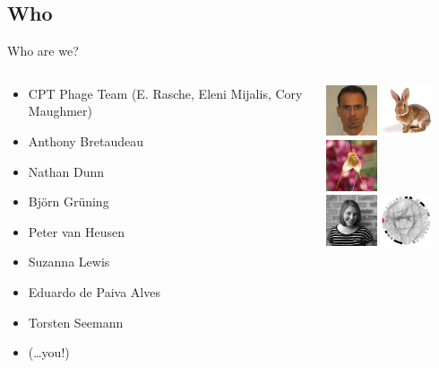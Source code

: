 \documentclass[12pt]{phage3slides} %
\begin{document}
\subsection{Who}
\begin{frame}{Who are we?}
    \begin{columns}
        \begin{column}{0.48\textwidth}
            \begin{itemize}
                \item CPT Phage Team (E. Rasche, Eleni Mijalis, Cory Maughmer)
                \item Anthony Bretaudeau
                \item Nathan Dunn
                \item Bj\"orn Gr\"uning
                \item Peter van Heusen
                \item Suzanna Lewis
                \item Eduardo de Paiva Alves
                \item Torsten Seemann
                \item (\ldots you!)
            \end{itemize}
        \end{column}
        \begin{column}{0.48\textwidth}
            \includegraphics[width=1.5cm]{people/Eduardo-Alves}
            \includegraphics[width=1.5cm]{people/abretaud}
            \includegraphics[width=1.5cm]{people/bgruening} \\
            \includegraphics[width=1.5cm]{people/elenimijalis}
            \includegraphics[width=1.5cm]{people/erasche}

\end{column}
\end{columns}
\end{frame}
\end{document}
